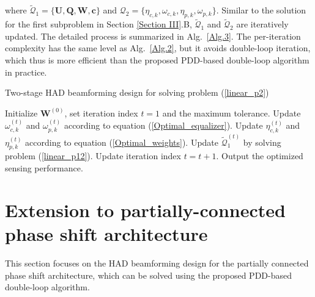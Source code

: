\documentclass[10pt,journal,twocolumn]{IEEEtran}
\begin{document}
where $\tilde{\mathcal{Q}}_1=\big\{\mathbf{U},\mathbf{Q},\mathbf{W},\mathbf{c}\big\}$ and $\mathcal {Q}_2=\big\{\eta_{c,k}, \omega_{c,k}, \eta_{p,k}, \omega_{p,k}\big\}$. Similar to the solution for the first subproblem in Section \ref{Section III}.B, $\tilde{\mathcal {Q}}_1$ and $\tilde{\mathcal {Q}}_2$ are iteratively updated. The detailed process is summarized in Alg.~\ref{Alg.3}. The per-iteration complexity has the same level as Alg.~\ref{Alg.2}, but it avoids double-loop iteration, which thus is more efficient than the proposed PDD-based double-loop algorithm in practice.
\begin{algorithm}[t]
	\caption{Two-stage HAD beamforming design for solving problem (\ref{linear_p2})}
	\begin{algorithmic}[1]\label{Alg.3}
		\STATE Initialize $\mathbf{W}^{(0)}$, set iteration index $t=1$  and the maximum tolerance.
		\STATE Update $\omega^{(t)}_{c,k}$ and $\omega^{(t)}_{p,k}$ according to equation (\ref{Optimal_equalizer}).
        \STATE Update $\eta^{(t)}_{c,k}$ and $\eta^{(t)}_{p,k}$ according to equation (\ref{Optimal_weights}).
        \STATE Update $\tilde{\mathcal{Q}}^{(t)}_1$ by solving problem (\ref{linear_p12}).
		\STATE Update iteration index $t=t+1$.
		\ENDWHILE	
		\STATE Output the optimized sensing performance.
	\end{algorithmic}
\end{algorithm} 

\section{Extension to partially-connected phase shift architecture}\label{Section IV}
This section focuses on the HAD beamforming design for the partially connected phase shift architecture, which can be solved using the proposed PDD-based double-loop algorithm.
\end{document}
